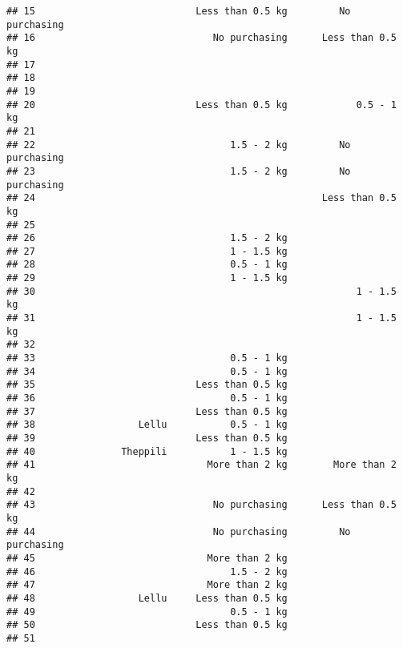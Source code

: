 \documentclass[
]{article}
\begin{document}
\begin{verbatim}
## 15                            Less than 0.5 kg         No purchasing
## 16                               No purchasing      Less than 0.5 kg
## 17                                                                  
## 18                                                                  
## 19                                                                  
## 20                            Less than 0.5 kg            0.5 - 1 kg
## 21                                                                  
## 22                                  1.5 - 2 kg         No purchasing
## 23                                  1.5 - 2 kg         No purchasing
## 24                                                  Less than 0.5 kg
## 25                                                                  
## 26                                  1.5 - 2 kg                      
## 27                                  1 - 1.5 kg                      
## 28                                  0.5 - 1 kg                      
## 29                                  1 - 1.5 kg                      
## 30                                                        1 - 1.5 kg
## 31                                                        1 - 1.5 kg
## 32                                                                  
## 33                                  0.5 - 1 kg                      
## 34                                  0.5 - 1 kg                      
## 35                            Less than 0.5 kg                      
## 36                                  0.5 - 1 kg                      
## 37                            Less than 0.5 kg                      
## 38                  Lellu           0.5 - 1 kg                      
## 39                            Less than 0.5 kg                      
## 40               Theppili           1 - 1.5 kg                      
## 41                              More than 2 kg        More than 2 kg
## 42                                                                  
## 43                               No purchasing      Less than 0.5 kg
## 44                               No purchasing         No purchasing
## 45                              More than 2 kg                      
## 46                                  1.5 - 2 kg                      
## 47                              More than 2 kg                      
## 48                  Lellu     Less than 0.5 kg                      
## 49                                  0.5 - 1 kg                      
## 50                            Less than 0.5 kg                      
## 51                                                                  

\end{verbatim}
\end{document}
